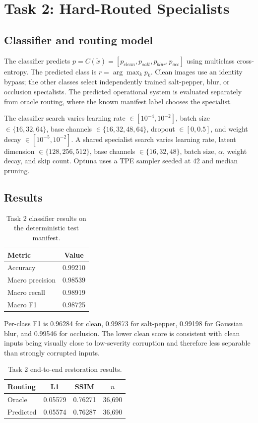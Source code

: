 \documentclass[conference]{IEEEtran}
\begin{document}
\section{Task 2: Hard-Routed Specialists}
\subsection{Classifier and routing model}
The classifier predicts $p=C(\tilde{x})=[p_{clean},p_{salt},p_{blur},p_{occ}]$ using multiclass cross-entropy. The predicted class is $r=\arg\max_k p_k$. Clean images use an identity bypass; the other classes select independently trained salt-pepper, blur, or occlusion specialists. The predicted operational system is evaluated separately from oracle routing, where the known manifest label chooses the specialist.

The classifier search varies learning rate $\in[10^{-4},10^{-2}]$, batch size $\in\{16,32,64\}$, base channels $\in\{16,32,48,64\}$, dropout $\in[0,0.5]$, and weight decay $\in[10^{-5},10^{-2}]$. A shared specialist search varies learning rate, latent dimension $\in\{128,256,512\}$, base channels $\in\{16,32,48\}$, batch size, $\alpha$, weight decay, and skip count. Optuna uses a TPE sampler seeded at 42 and median pruning.

\subsection{Results}
\begin{table}[t]
\caption{Task 2 classifier results on the deterministic test manifest.}
\label{tab:classifier}
\centering
\begin{tabular}{lc}
\toprule
Metric & Value\\
\midrule
Accuracy & 0.99210\\
Macro precision & 0.98539\\
Macro recall & 0.98919\\
Macro F1 & 0.98725\\
\bottomrule
\end{tabular}
\end{table}

Per-class F1 is 0.96284 for clean, 0.99873 for salt-pepper, 0.99198 for Gaussian blur, and 0.99546 for occlusion. The lower clean score is consistent with clean inputs being visually close to low-severity corruption and therefore less separable than strongly corrupted inputs.

\begin{table}[t]
\caption{Task 2 end-to-end restoration results.}
\label{tab:task2restoration}
\centering
\begin{tabular}{lccc}
\toprule
Routing & L1 & SSIM & $n$\\
\midrule
Oracle & 0.05579 & 0.76271 & 36,690\\
Predicted & 0.05574 & 0.76287 & 36,690\\
\bottomrule
\end{tabular}
\end{table}
\end{document}
